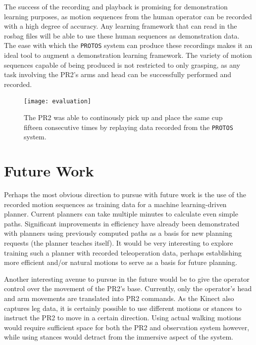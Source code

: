 \documentclass{sig-alternate}
\begin{document}
\indent The success of the recording and playback is promising for demonstration learning purposes, as motion sequences from the
 human operator can be recorded with a high degree of
accuracy. Any learning framework that can read in the rosbag files will be able to use these human sequences as demonstration data. The ease with which the {\tt PROTOS} system can 
produce these recordings makes it an ideal tool to augment a demonstration learning framework. The variety of motion sequences capable of being produced is not restricted
to only grasping, as any task involving the PR2's arms and head can be successfully performed and recorded.

\begin{figure}[htb] 
	\begin{center}
		\texttt{[image: evaluation]}
	\end{center}
	\caption{The PR2 was able to continously pick up and place the same cup fifteen consecutive times by replaying data recorded from the {\tt PROTOS} system.}
	\label{fig:evaluation}
\end{figure}

\section{Future Work}
\label{sec:future_work} Perhaps the most obvious direction to pursue with
future work is the use of the recorded motion sequences as training data
for a machine learning-driven planner. Current planners can take multiple 
minutes to 
calculate even simple paths. Significant improvements in efficiency have 
already been demonstrated with planners using previously computed paths as a 
basis for new planning requests (the planner teaches itself). It would be
very interesting to explore training such a planner with recorded teleoperation
data, perhaps establishing more efficient and/or natural motions to serve as
a basis for future planning.

Another interesting avenue to pursue in the future would be to give the 
operator control over the movement of the PR2's base. Currently, only
the operator's head and arm movements are translated into PR2 commands. As the
Kinect also captures leg data, it is certainly possible to use different
motions or stances to instruct the PR2 to move in a certain direction.
Using actual walking motions would require sufficient space for both the PR2
and observation system however, while 
using stances would detract from the immersive aspect of the system.
\end{document}
